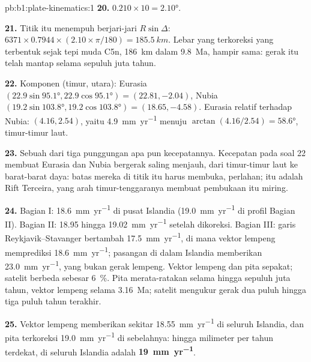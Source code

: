 \begin{solution}{pb:b1:plate-kinematics:1}
\textbf{20.} $0.210\times10 = \ang{2.10}$.

\textbf{21.} Titik itu menempuh  berjari-jari $R\sin\Delta$:
$6371\times0.7944\times(2.10\times\pi/180) = \qty{185.5}{km}$. Lebar  yang terkoreksi
yang terbentuk sejak tepi muda C5n, \qty{186}{km} dalam
\qty{9.8}{Ma}, hampir sama: gerak itu telah mantap selama sepuluh
juta tahun.

\textbf{22.} Komponen (timur, utara): Eurasia
$(22.9\sin\ang{95.1}, 22.9\cos\ang{95.1}) = (22.81, -2.04)$, Nubia
$(19.2\sin\ang{103.8}, 19.2\cos\ang{103.8}) = (18.65, -4.58)$. Eurasia relatif
terhadap Nubia: $(4.16, 2.54)$, yaitu \qty{4.9}{mm.yr^{-1}} menuju
$\arctan(4.16/2.54) = \ang{58.6}$, timur-timur laut.

\textbf{23.} Sebuah  dari tiga punggungan  apa pun kecepatannya. Kecepatan pada soal 22 membuat Eurasia dan Nubia bergerak saling menjauh, dari timur-timur laut ke barat-barat daya: batas mereka di titik itu harus membuka, perlahan; itu adalah Rift Terceira, yang arah timur-tenggaranya membuat pembukaan itu miring.

\textbf{24.} Bagian I: \qty{18.6}{mm.yr^{-1}} di pusat Islandia (\qty{19.0}{mm.yr^{-1}} di profil Bagian II). Bagian II: 18.95 hingga \qty{19.02}{mm.yr^{-1}} setelah dikoreksi. Bagian III: garis Reykjavik--Stavanger bertambah \qty{17.5}{mm.yr^{-1}}, di mana vektor lempeng memprediksi \qty{18.6}{mm.yr^{-1}}; pasangan di dalam Islandia memberikan \qty{23.0}{mm.yr^{-1}}, yang bukan gerak lempeng. Vektor lempeng dan pita sepakat; satelit berbeda sebesar \qty{6}{\percent}. Pita merata-ratakan selama hingga sepuluh juta tahun, vektor lempeng selama \qty{3.16}{Ma}; satelit mengukur gerak dua puluh hingga tiga puluh tahun terakhir.

\textbf{25.} Vektor lempeng memberikan sekitar \qty{18.55}{mm.yr^{-1}} di seluruh Islandia, dan pita terkoreksi \qty{19.0}{mm.yr^{-1}} di sebelahnya: hingga milimeter per tahun terdekat,  di seluruh Islandia adalah
\textbf{\qty[text-series-to-math=true]{19}{mm.yr^{-1}}}.
\end{solution}
